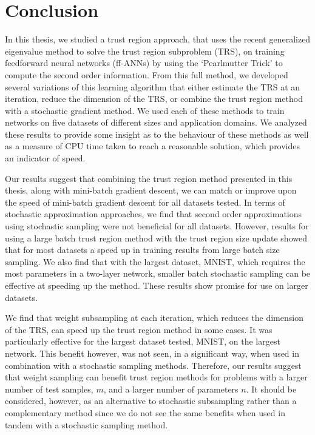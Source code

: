 \documentclass[letterpaper,12pt,titlepage,oneside,final]{book}
\begin{document}
	\chapter{Conclusion}
	
	In this thesis, we studied a trust region approach, that uses the recent generalized eigenvalue method to solve the trust region subproblem (TRS), on training feedforward neural networks (ff-ANNs) by using the `Pearlmutter Trick' to compute the second order information. From this full method, we developed several variations of this learning algorithm that either estimate the TRS at an iteration, reduce the dimension of the TRS, or combine the trust region method with a stochastic gradient method. We used each of these methods to train networks on five datasets of different sizes and application domains. We analyzed these results to provide some insight as to the behaviour of these methods as well as a measure of CPU time taken to reach a reasonable solution, which provides an indicator of speed.
	
	Our results suggest that combining the trust region method presented in this thesis, along with mini-batch gradient descent, we can match or improve upon the speed of mini-batch gradient descent for all datasets tested. In terms of stochastic approximation approaches, we find that second order approximations using stochastic sampling were not beneficial for all datasets. However, results for using a large batch trust region method with the trust region size update showed that for most datasets a speed up in training results from large batch size sampling. We also find that with the largest dataset, MNIST, which requires the most parameters in a two-layer network, smaller batch stochastic sampling can be effective at speeding up the method. These results show promise for use on larger datasets.
	
	We find that weight subsampling at each iteration, which reduces the dimension of the TRS, can speed up the trust region method in some cases. It was particularly effective for the largest dataset tested, MNIST, on the largest network. This benefit however, was not seen, in a significant way, when used in combination with a stochastic sampling methods. Therefore, our results suggest that weight sampling can benefit trust region methods for problems with a larger number of test samples, $m$, and a larger number of parameters $n$. It should be considered, however, as an alternative to stochastic subsampling rather than a complementary method since we do not see the same benefits when used in tandem with a stochastic sampling method.
	
\end{document}
